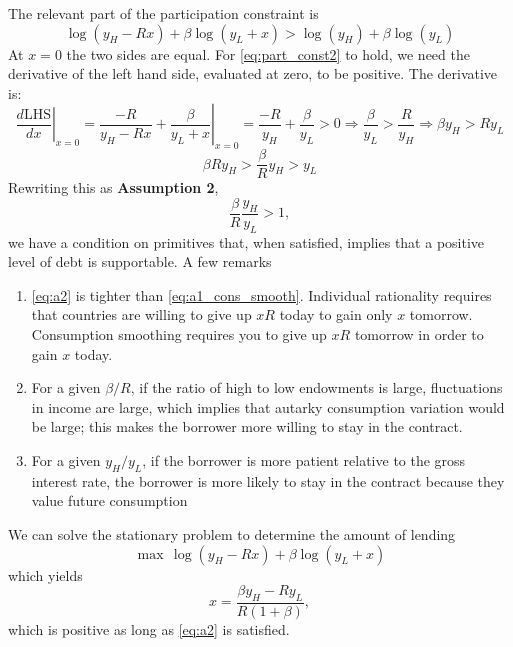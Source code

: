 \documentclass[11pt, pdftex]{article}
\begin{document}
The relevant part of the participation constraint is	
\begin{equation} \label{eq:part_const2}
\log \left( {{y_H} - Rx} \right) + \beta \log \left( {{y_L} + x} \right) > \log \left( {{y_H}} \right) + \beta \log \left( {{y_L}} \right)
\end{equation}
At $x = 0$ the two sides are equal.  For \eqref{eq:part_const2} to hold, we need the derivative of the left hand side, evaluated at zero, to be positive.  The derivative is:
	\[{\left. {\frac{{d\mathrm{LHS}}}{{dx}}} \right|_{x = 0}} = {\left. {\frac{{ - R}}{{{y_H} - Rx}} + \frac{\beta }{{{y_L} + x}}} \right|_{x = 0}} = \frac{{ - R}}{{{y_H}}} + \frac{\beta }{{{y_L}}} > 0 \Rightarrow \frac{\beta }{{{y_L}}} > \frac{R}{{{y_H}}} \Rightarrow \beta {y_H} > R{y_L}\]
	\[\beta R{y_H} > \frac{\beta }{R}{y_H} > {y_L}\]
Rewriting this as \textbf{Assumption 2},
\begin{equation}\label{eq:a2}
\frac{\beta }{R}\frac{{{y_H}}}{{{y_L}}} > 1,
\end{equation}
we have a condition on primitives that, when satisfied, implies that a positive level of debt is supportable. A few remarks
\begin{enumerate}
  \item \eqref{eq:a2} is tighter than \eqref{eq:a1_cons_smooth}.  Individual rationality requires that countries are willing to give up $xR$ today to gain only $x$ tomorrow.  Consumption smoothing requires you to give up $xR$ tomorrow in order to gain $x$ today.
  \item For a given $\beta/R$, if the ratio of high to low endowments is large, fluctuations in income are large, which implies that autarky consumption variation would be large; this makes the borrower more willing to stay in the contract.
    \item For a given ${y_H}/{y_L}$, if the borrower is more patient relative to the gross interest rate, the borrower is more likely to stay in the contract because they value future consumption
\end{enumerate}

We can solve the stationary problem to determine the amount of lending
\begin{equation}
\max \,\log \left( {{y_H} - Rx} \right) + \beta \log \left( {{y_L} + x} \right)
\end{equation}
which yields
\begin{equation}
x = \frac{\beta y_H-Ry_L}{R\left(1+\beta \right)},
\end{equation}
which is positive as long as \eqref{eq:a2} is satisfied.
\end{document}
